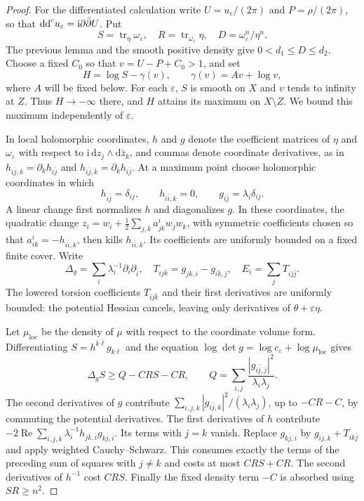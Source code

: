 \begin{proof}
For the differentiated calculation write $U=u_\varepsilon/(2\pi)$ and $P=\rho/(2\pi)$, so that $\mathrm{dd}^{\mathrm{c}} u_\varepsilon=\mathrm{i}\partial\bar\partial U$. Put
\[
 S=\operatorname{tr}_\eta\omega_\varepsilon,
 \quad R=\operatorname{tr}_{\omega_\varepsilon}\eta,
 \quad D=\omega_\varepsilon^n/\eta^n.
\]
The previous lemma and the smooth positive density give $0<d_1\leq D\leq d_2$. Choose a fixed $C_0$ so that $v=U-P+C_0>1$, and set
\[
 H=\log S-\gamma(v),\qquad \gamma(v)=Av+\log v,
\]
where $A$ will be fixed below. For each $\varepsilon$, $S$ is smooth on $X$ and $v$ tends to infinity at $Z$. Thus $H\to-\infty$ there, and $H$ attains its maximum on $X\setminus Z$. We bound this maximum independently of $\varepsilon$.

In local holomorphic coordinates, $h$ and $g$ denote the coefficient matrices of $\eta$ and $\omega_\varepsilon$ with respect to $\mathrm{i}\,\mathrm{d}z_j\wedge\mathrm{d}\bar z_k$, and commas denote coordinate derivatives, as in $h_{i\bar j,k}=\partial_kh_{i\bar j}$ and $h_{i\bar j,\bar k}=\partial_{\bar k}h_{i\bar j}$. At a maximum point choose holomorphic coordinates in which
\[
 h_{i\bar j}=\delta_{ij},\qquad h_{i\bar i,k}=0,
 \qquad g_{i\bar j}=\lambda_i\delta_{ij}.
\]
A linear change first normalizes $h$ and diagonalizes $g$. In these coordinates, the quadratic change $z_i=w_i+\frac12\sum_{j,k}a^i_{jk}w_jw_k$, with symmetric coefficients chosen so that $a^i_{ik}=-h_{i\bar i,k}$, then kills $h_{i\bar i,k}$. Its coefficients are uniformly bounded on a fixed finite cover. Write
\[
 \Delta_g=\sum_i\lambda_i^{-1}\partial_i\partial_{\bar i},
 \quad T_{ij\bar k}=g_{j\bar k,i}-g_{i\bar k,j},
 \quad E_i=\sum_jT_{ij\bar j}.
\]
The lowered torsion coefficients $T_{ij\bar k}$ and their first derivatives are uniformly bounded: the potential Hessian cancels, leaving only derivatives of $\theta+\varepsilon\eta$.

Let $\mu_{\mathrm{loc}}$ be the density of $\mu$ with respect to the coordinate volume form. Differentiating $S=h^{k\bar\ell}g_{k\bar\ell}$ and the equation $\log\det g=\log c_\varepsilon+\log\mu_{\mathrm{loc}}$ gives
\begin{equation}\label{eq:degeneration-trace-calculus}
 \Delta_g S\geq Q-CRS-CR,
 \qquad
 Q=\sum_{i,j}\frac{|g_{i\bar j,j}|^2}{\lambda_i\lambda_j}.
\end{equation}
The second derivatives of $g$ contribute
$\sum_{i,j,k}|g_{i\bar j,k}|^2/(\lambda_i\lambda_j)$, up to $-CR-C$, by commuting the potential derivatives. The first derivatives of $h$ contribute
$-2\operatorname{Re}\sum_{i,j,k}\lambda_i^{-1}h_{j\bar k,\bar i}g_{k\bar j,i}$. Its terms with $j=k$ vanish. Replace $g_{k\bar j,i}$ by $g_{i\bar j,k}+T_{ik\bar j}$ and apply weighted Cauchy--Schwarz. This consumes exactly the terms of the preceding sum of squares with $j\ne k$ and costs at most $CRS+CR$. The second derivatives of $h^{-1}$ cost $CRS$. Finally the fixed density term $-C$ is absorbed using $SR\geq n^2$.


\end{proof}
